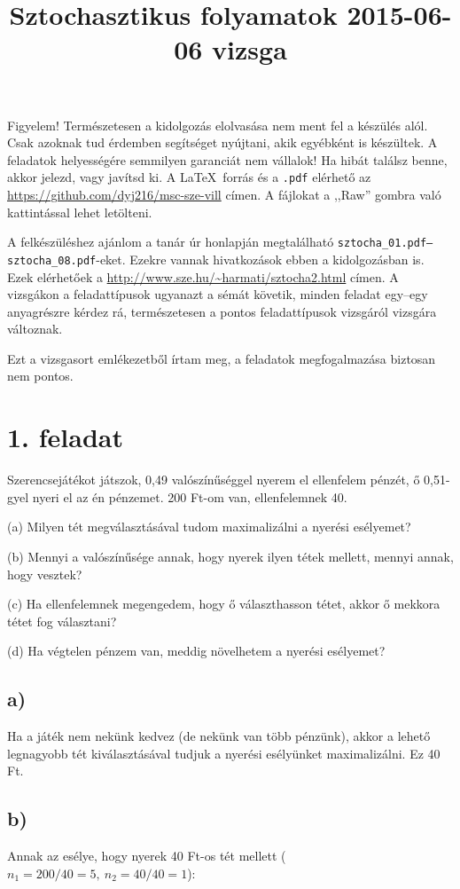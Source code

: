 \documentclass[a4paper,12pt]{article}
\title{Sztochasztikus folyamatok 2015-06-06 vizsga}
\begin{document}
\maketitle

Figyelem! Természetesen a kidolgozás elolvasása nem ment fel a készülés
alól. Csak azoknak tud érdemben segítséget nyújtani, akik egyébként is
készültek. A feladatok helyességére semmilyen garanciát nem vállalok!
Ha hibát találsz benne, akkor jelezd, vagy javítsd ki. A \LaTeX\ forrás és 
a \texttt{.pdf} elérhető az \url{https://github.com/dyj216/msc-sze-vill} 
címen. A fájlokat a ,,Raw'' gombra való kattintással lehet letölteni.

A felkészüléshez ajánlom a tanár úr honlapján megtalálható 
\texttt{\mbox{sztocha\_01.pdf}--\mbox{sztocha\_08.pdf}}-eket. Ezekre vannak hivatkozások 
ebben a kidolgozásban is. Ezek elérhetőek a 
\url{http://www.sze.hu/~harmati/sztocha2.html} címen. A vizsgákon a 
feladattípusok ugyanazt a sémát követik, minden feladat egy--egy 
anyagrészre kérdez rá, természetesen a pontos feladattípusok vizsgáról
vizsgára változnak.

Ezt a vizsgasort emlékezetből írtam meg, a feladatok megfogalmazása
biztosan nem pontos.

\section*{1. feladat}
Szerencsejátékot játszok, 0,49 valószínűséggel nyerem el ellenfelem 
pénzét, ő 0,51-gyel nyeri el az én pénzemet. 200 Ft-om van,
ellenfelemnek 40.

(a) Milyen tét megválasztásával tudom maximalizálni a nyerési 
esélyemet?

(b) Mennyi a valószínűsége annak, hogy nyerek ilyen tétek mellett, 
mennyi annak, hogy vesztek?

(c) Ha ellenfelemnek megengedem, hogy ő választhasson tétet, 
akkor ő mekkora tétet fog választani?

(d) Ha végtelen pénzem van, meddig növelhetem a nyerési esélyemet?

\subsection*{a)}
Ha a játék nem nekünk kedvez (de nekünk van több pénzünk), akkor
a lehető legnagyobb tét kiválasztásával tudjuk a nyerési esélyünket
maximalizálni. Ez 40 Ft.

\subsection*{b)}
Annak az esélye, hogy nyerek 40 Ft-os tét mellett 
($n_1 = 200/40 = 5, \ n_2 = 40/40 = 1$):
\end{document}
